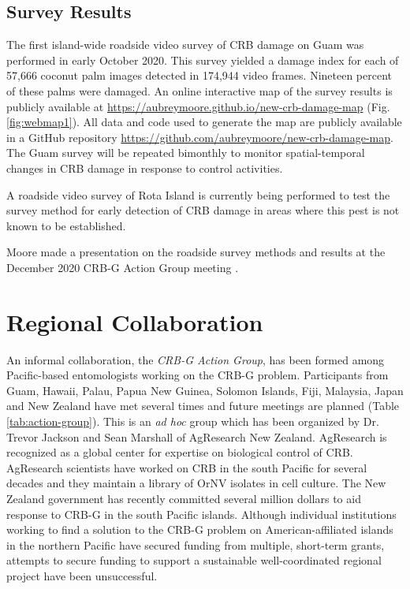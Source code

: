 \documentclass[12pt,letterpaper,english,bibliography=totocnumbered,abstract=on]{scrartcl}
\begin{document}
\subsection{Survey Results}


The first island-wide roadside video survey of CRB damage on Guam was performed in early October 2020.  This survey yielded a damage index for each of 57,666 coconut palm images detected in 174,944 video frames. Nineteen percent of these palms were damaged. An online interactive map of the survey results is publicly available at \url{https://aubreymoore.github.io/new-crb-damage-map} (Fig. \ref{fig:webmap1}). All data and code used to generate the map are publicly available in a GitHub repository \url{https://github.com/aubreymoore/new-crb-damage-map}. The Guam survey will be repeated bimonthly to monitor spatial-temporal changes in CRB damage in response to control activities.

A roadside video survey of Rota Island is currently being performed to test the survey method for early detection of CRB damage in areas where this pest is not known to be established.

Moore made a presentation on the roadside survey methods and results at the December 2020 CRB-G Action Group meeting \cite{mooreVideoRecordingCRBG2020}.

\section{Regional Collaboration}


An informal collaboration, the \textit{CRB-G Action Group}, has been formed among Pacific-based entomologists working on the CRB-G problem. Participants from Guam, Hawaii, Palau, Papua New Guinea, Solomon Islands, Fiji, Malaysia, Japan and New Zealand have met several times and future meetings are planned (Table \ref{tab:action-group}).  This is an \textit{ad hoc} group which has been organized by Dr. Trevor Jackson and Sean Marshall of AgResearch New Zealand. AgResearch is recognized as a global center for expertise on biological control of CRB. AgResearch scientists have worked on CRB in the south Pacific for several decades and they maintain a library of OrNV isolates in cell culture. The New Zealand government has recently committed several million dollars to aid response to CRB-G in the south Pacific islands. Although individual institutions working to find a solution to the CRB-G problem on American-affiliated islands in the northern Pacific have secured funding from multiple, short-term grants, attempts to secure funding to support a sustainable well-coordinated regional project have been unsuccessful. 
\end{document}
